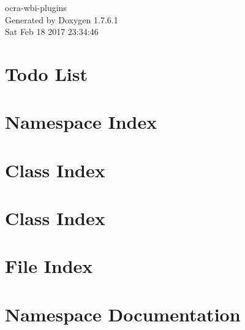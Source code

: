 \documentclass[a4paper]{book}
\begin{document}
\hypersetup{pageanchor=false,citecolor=blue}
\begin{titlepage}
\vspace*{7cm}
\begin{center}
{\Large ocra-\/wbi-\/plugins }\\
\vspace*{1cm}
{\large \-Generated by Doxygen 1.7.6.1}\\
\vspace*{0.5cm}
{\small Sat Feb 18 2017 23:34:46}\\
\end{center}
\end{titlepage}
\clearemptydoublepage
{}
\tableofcontents
\clearemptydoublepage
{}
\hypersetup{pageanchor=true,citecolor=blue}
\chapter{\-Todo \-List}
\label{todo}
\hypertarget{todo}{}

\chapter{\-Namespace \-Index}

\chapter{\-Class \-Index}

\chapter{\-Class \-Index}

\chapter{\-File \-Index}

\chapter{\-Namespace \-Documentation}

\end{document}
